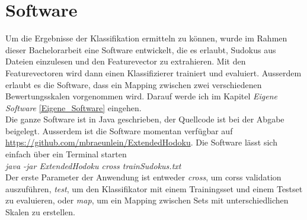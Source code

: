 \chapter{Software}
Um die Ergebnisse der Klassifikation ermitteln zu können, wurde im Rahmen dieser Bachelorarbeit eine Software entwickelt, die es erlaubt, Sudokus aus Dateien einzulesen und den Featurevector zu extrahieren. Mit den Featurevectoren wird dann einen Klassifizierer trainiert und evaluiert. Ausserdem erlaubt es die Software, dass ein Mapping zwischen zwei verschiedenen Bewertungsskalen vorgenommen wird. Darauf werde ich im Kapitel \textit{Eigene Software} \ref{Eigene_Software} eingehen.\\
Die ganze Software ist in Java geschrieben, der Quellcode ist bei der Abgabe beigelegt. Ausserdem ist die Software momentan verfügbar auf \url{https://github.com/mbraeunlein/ExtendedHodoku}. Die Software lässt sich einfach über ein Terminal starten\\
\textit{java -jar ExtendedHodoku cross trainSudokus.txt}\\
Der erste Parameter der Anwendung ist entweder \textit{cross}, um corss validation auszuführen, \textit{test}, um den Klassifikator mit einem Trainingsset und einem Testset zu evaluieren, oder \textit{map}, um ein Mapping zwischen Sets mit unterschiedlichen Skalen zu erstellen.